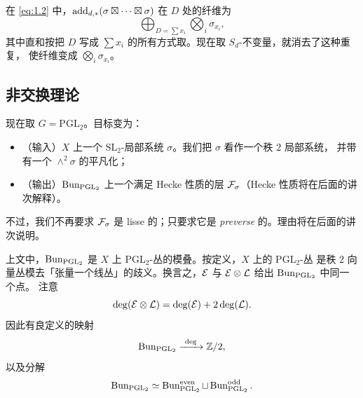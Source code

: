 \begin{remark}\label{rem:sym}
在 \eqref{eq:1.2} 中，\(\operatorname{add}_{d,*}(\sigma\boxtimes\cdots\boxtimes\sigma)\) 在 \(D\) 处的纤维为
\[
\bigoplus_{D=\sum x_i}\bigotimes_i\sigma_{x_i},
\]
其中直和按把 \(D\) 写成 \(\sum x_i\) 的所有方式取。现在取 \(S_d\)-不变量，就消去了这种重复，
使纤维变成 \(\bigotimes_i\sigma_{x_i}\)。
\end{remark}

\subsection{非交换理论}

现在取 \(G=\mathrm{PGL}_2\)。目标变为：

\begin{itemize}
\item （输入）\(X\) 上一个 \(\mathrm{SL}_2\)-局部系统 \(\sigma\)。我们把 \(\sigma\) 看作一个秩 \(2\) 局部系统，
并带有一个 \(\wedge^2\sigma\) 的平凡化；
\item （输出）\(\operatorname{Bun}_{\mathrm{PGL}_2}\) 上一个满足 Hecke 性质的层 \(\mathcal{F}_\sigma\)（Hecke 性质将在后面的讲次解释）。
\end{itemize}

不过，我们不再要求 \(\mathcal{F}_\sigma\) 是 lisse 的；只要求它是 \emph{preverse} 的。理由将在后面的讲次说明。

上文中，\(\operatorname{Bun}_{\mathrm{PGL}_2}\) 是 \(X\) 上 \(\mathrm{PGL}_2\)-丛的模叠。按定义，\(X\) 上的 \(\mathrm{PGL}_2\)-丛
是秩 \(2\) 向量丛模去「张量一个线丛」的歧义。换言之，\(\mathcal{E}\) 与 \(\mathcal{E}\otimes\mathcal{L}\) 给出 \(\operatorname{Bun}_{\mathrm{PGL}_2}\) 中同一个点。
注意
\[
\deg(\mathcal{E}\otimes\mathcal{L})=\deg(\mathcal{E})+2\deg(\mathcal{L}).
\]
因此有良定义的映射
\[
\Bun_{\mathrm{PGL}_2}\xrightarrow{\ \deg\ }\Z/2,
\]
以及分解
\[
\operatorname{Bun}_{\mathrm{PGL}_2}\simeq\operatorname{Bun}_{\mathrm{PGL}_2}^{\mathrm{even}}\sqcup\operatorname{Bun}_{\mathrm{PGL}_2}^{\mathrm{odd}}.
\]

